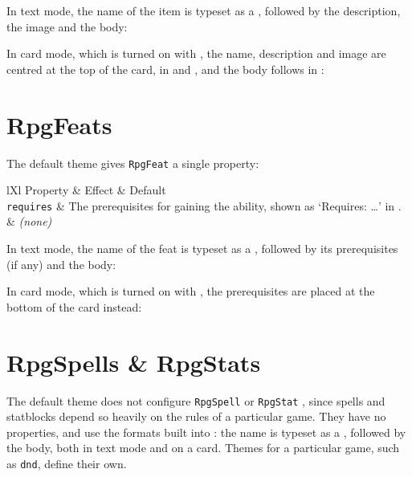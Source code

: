 		In text mode, the name of the item is typeset as a , followed by the description, the image and the body:


		In card mode, which is turned on with  , the name, description and image are centred at the top of the card, in  and , and the body follows in :


	\section{RpgFeats}\label{S:DefaultFeat}

		The default theme gives \texttt{RpgFeat}  a single property:
		\begin{RpgTable}{lXl}
			Property & Effect & Default
			\\
			\texttt{requires} & The prerequisites for gaining the ability, shown as `Requires: \ldots' in . & \textit{(none)}
		\end{RpgTable}

		In text mode, the name of the feat is typeset as a , followed by its prerequisites (if any) and the body:


		In card mode, which is turned on with  , the prerequisites are placed at the bottom of the card instead:


	\section{RpgSpells \& RpgStats}\label{S:DefaultSpellStat}

		The default theme does not configure \texttt{RpgSpell} or \texttt{RpgStat} , since spells and statblocks depend so heavily on the rules of a particular game. They have no properties, and use the formats built into \rpgtex{}: the name is typeset as a , followed by the body, both in text mode and on a card. Themes for a particular game, such as \texttt{dnd}, define their own.
